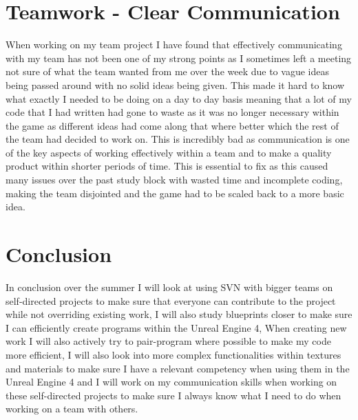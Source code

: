 \documentclass{scrartcl}
\begin{document}
\section{Teamwork - Clear Communication}

When working on my team project I have found that effectively communicating with my team has not been one of my strong points as I sometimes left a meeting not sure of what the team wanted from me over the week due to vague ideas being passed around with no solid ideas being given. This made it hard to know what exactly I needed to be doing on a day to day basis meaning that a lot of my code that I had written had gone to waste as it was no longer necessary within the game as different ideas had come along that where better which the rest of the team had decided to work on. This is incredibly bad as communication is one of the key aspects of working effectively within a team and to make a quality product within shorter periods of time. This is essential to fix as this caused many issues over the past study block with wasted time and incomplete coding, making the team disjointed and the game had to be scaled back to a more basic idea.

\section{Conclusion}

In conclusion over the summer I will look at using SVN with bigger teams on self-directed projects to make sure that everyone can contribute to the project while not overriding existing work, I will also study blueprints closer to make sure I can efficiently create programs within the Unreal Engine 4, When creating new work I will also actively try to pair-program where possible to make my code more efficient, I will also look into more complex functionalities within textures and materials to make sure I have a relevant competency when using them in the Unreal Engine 4 and I will work on my communication skills when working on these self-directed projects to make sure I always know what I need to do when working on a team with others.
\end{document}
